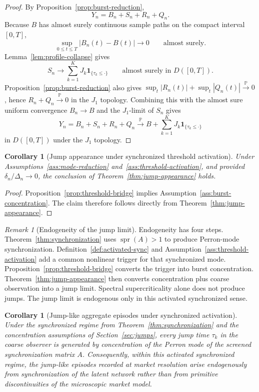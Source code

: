\documentclass[11pt,a4paper]{amsart}
\theoremstyle{plain}
\newtheorem{corollary}[theorem]{Corollary}
\theoremstyle{definition}
\theoremstyle{remark}
\newtheorem{remark}[theorem]{Remark}
\DeclareMathOperator{\spr}{spr}
\newcommand{\PP}{\mathbb{P}}
\newcommand{\one}{\mathbf{1}}
\newcommand{\toP}{\xrightarrow{\PP}}
\begin{document}
\begin{proof}
By Proposition~\ref{prop:burst-reduction},
\[
        Y_n=B_n+S_n+R_n+Q_n.
\]
Because \(B\) has almost surely continuous sample paths on the compact interval \([0,T]\),
\[
        \sup_{0\le t\le T}|B_n(t)-B(t)|
        \to 0
        \qquad
        \text{almost surely}.
\]
Lemma~\ref{lem:profile-collapse} gives
\[
        S_n
        \to
        \sum_{k=1}^K J_k\one_{\{\tau_k\le \cdot\}}
        \qquad
        \text{almost surely in } D([0,T]).
\]
Proposition~\ref{prop:burst-reduction} also gives
\(\sup_t |R_n(t)|+\sup_t |Q_n(t)|\toP0\), hence \(R_n+Q_n\toP0\) in the \(J_1\)
topology.  Combining this with the almost sure uniform convergence \(B_n\to B\) and the
\(J_1\)-limit of \(S_n\) gives
\[
        Y_n
        =
        B_n+S_n+R_n+Q_n
        \toP
        B+\sum_{k=1}^K J_k\one_{\{\tau_k\le \cdot\}}
\]
in \(D([0,T])\) under the \(J_1\) topology.
\end{proof}

\begin{corollary}[Jump appearance under synchronized threshold activation]\label{cor:threshold-jumps}
Under Assumptions~\ref{ass:mode-reduction} and~\ref{ass:threshold-activation}, and provided
\(\delta_n/\Delta_n\to0\), the conclusion of Theorem~\ref{thm:jump-appearance} holds.
\end{corollary}

\begin{proof}
Proposition~\ref{prop:threshold-bridge} implies Assumption~\ref{ass:burst-concentration}.  The
claim therefore follows directly from Theorem~\ref{thm:jump-appearance}.
\end{proof}

\begin{remark}[Endogeneity of the jump limit]
Endogeneity has four steps.  Theorem~\ref{thm:synchronization} uses \(\spr(A)>1\) to produce
Perron-mode synchronization.  Definition~\ref{def:activated-sync} and
Assumption~\ref{ass:threshold-activation} add a common nonlinear trigger for that synchronized
mode.  Proposition~\ref{prop:threshold-bridge} converts the trigger into burst concentration.
Theorem~\ref{thm:jump-appearance} then converts concentration plus coarse observation into a jump
limit.  Spectral supercriticality alone does not produce jumps.  The jump limit is endogenous only
in this activated synchronized sense.
\end{remark}

\begin{corollary}[Jump-like aggregate episodes under synchronized activation]\label{cor:crash-synchronization}
Under the synchronized regime from Theorem~\ref{thm:synchronization} and the concentration
assumptions of Section~\ref{sec:jumps}, every jump time \(\tau_k\) in the coarse observer is
generated by concentration of the Perron mode of the screened synchronization matrix \(A\).
Consequently, within this activated synchronized regime, the jump-like episodes recorded at market
resolution arise endogenously from synchronization of the latent network rather than from
primitive discontinuities of the microscopic market model.
\end{corollary}
\end{document}
